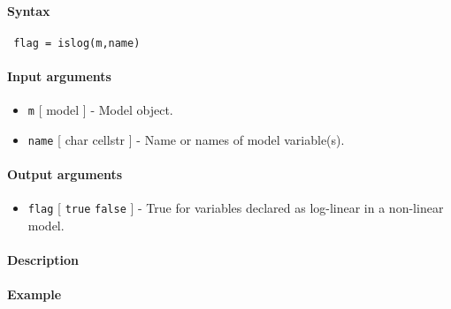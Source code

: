 


	\paragraph{Syntax}
 
 \begin{verbatim}
 flag = islog(m,name)
 \end{verbatim}
 
 \paragraph{Input arguments}
 
 \begin{itemize}
 \item
   \texttt{m} {[} model {]} - Model object.
 \item
   \texttt{name} {[} char \textbar{} cellstr {]} - Name or names of model
   variable(s).
 \end{itemize}
 
 \paragraph{Output arguments}
 
 \begin{itemize}
 \item
   \texttt{flag} {[} \texttt{true} \textbar{} \texttt{false} {]} - True
   for variables declared as log-linear in a non-linear model.
 \end{itemize}
 
 \paragraph{Description}
 
 \paragraph{Example}


